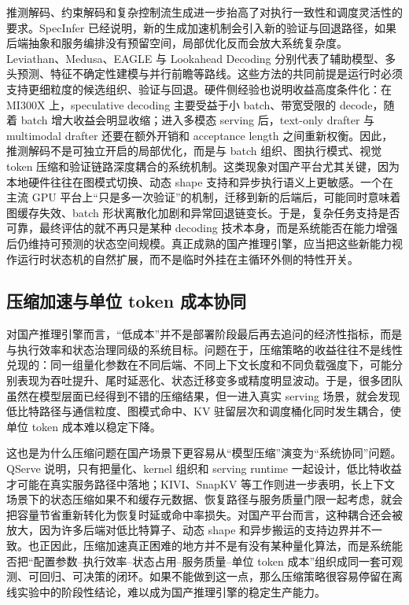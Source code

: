 推测解码、约束解码和复杂控制流生成进一步抬高了对执行一致性和调度灵活性的要求。SpecInfer 已经说明，新的生成加速机制会引入新的验证与回退路径，如果后端抽象和服务编排没有预留空间，局部优化反而会放大系统复杂度\citep{specinfer2023}。Leviathan、Medusa、EAGLE 与 Lookahead Decoding 分别代表了辅助模型、多头预测、特征不确定性建模与并行前瞻等路线\citep{leviathan2023fast,cai2024medusa,li2024eagle,fu2024lookahead}。这些方法的共同前提是运行时必须支持更细粒度的候选组织、验证与回退。硬件侧经验也说明收益高度条件化：在 MI300X 上，speculative decoding 主要受益于小 batch、带宽受限的 decode，随着 batch 增大收益会明显收缩；进入多模态 serving 后，text-only drafter 与 multimodal drafter 还要在额外开销和 acceptance length 之间重新权衡\citep{singh2025specdecmi300x,kamani2025multimodalspecdec}。因此，推测解码不是可独立开启的局部优化，而是与 batch 组织、图执行模式、视觉 token 压缩和验证链路深度耦合的系统机制。这类现象对国产平台尤其关键，因为本地硬件往往在图模式切换、动态 shape 支持和异步执行语义上更敏感。一个在主流 GPU 平台上“只是多一次验证”的机制，迁移到新的后端后，可能同时意味着图缓存失效、batch 形状离散化加剧和异常回退链变长。于是，复杂任务支持是否可靠，最终评估的就不再只是某种 decoding 技术本身，而是系统能否在能力增强后仍维持可预测的状态空间规模。真正成熟的国产推理引擎，应当把这些新能力视作运行时状态机的自然扩展，而不是临时外挂在主循环外侧的特性开关。

\subsection{压缩加速与单位 token 成本协同}

对国产推理引擎而言，“低成本”并不是部署阶段最后再去追问的经济性指标，而是与执行效率和状态治理同级的系统目标。问题在于，压缩策略的收益往往不是线性兑现的：同一组量化参数在不同后端、不同上下文长度和不同负载强度下，可能分别表现为吞吐提升、尾时延恶化、状态迁移变多或精度明显波动。于是，很多团队虽然在模型层面已经得到不错的压缩结果，但一进入真实 serving 场景，就会发现低比特路径与通信粒度、图模式命中、KV 驻留层次和调度桶化同时发生耦合，使单位 token 成本难以稳定下降。

这也是为什么压缩问题在国产场景下更容易从“模型压缩”演变为“系统协同”问题。QServe 说明，只有把量化、kernel 组织和 serving runtime 一起设计，低比特收益才可能在真实服务路径中落地\citep{wang2024qserve}；KIVI、SnapKV 等工作则进一步表明，长上下文场景下的状态压缩如果不和缓存元数据、恢复路径与服务质量门限一起考虑，就会把容量节省重新转化为恢复时延或命中率损失\citep{liu2024kivi,li2024snapkv}。对国产平台而言，这种耦合还会被放大，因为许多后端对低比特算子、动态 shape 和异步搬运的支持边界并不一致。也正因此，压缩加速真正困难的地方并不是有没有某种量化算法，而是系统能否把“配置参数--执行效率--状态占用--服务质量--单位 token 成本”组织成同一套可观测、可回归、可决策的闭环。如果不能做到这一点，那么压缩策略很容易停留在离线实验中的阶段性结论，难以成为国产推理引擎的稳定生产能力。

